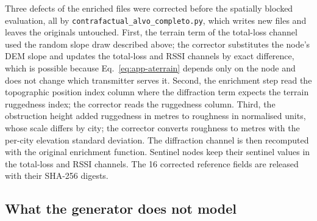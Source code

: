 Three defects of the enriched files were corrected before the spatially
blocked evaluation, all by \texttt{contrafactual\_\allowbreak{}alvo\_\allowbreak{}completo\allowbreak{}.py}, which
writes new files and leaves the originals untouched. First, the terrain term
of the total-loss channel used the random slope draw described above; the
corrector substitutes the node's DEM slope and updates the total-loss and
RSSI channels by exact difference, which is possible because
Eq.~\eqref{eq:app-aterrain} depends only on the node and does not change which
transmitter serves it. Second, the enrichment step read the topographic
position index column where the diffraction term expects the terrain
ruggedness index; the corrector reads the ruggedness column. Third, the
obstruction height added ruggedness in metres to roughness in normalised
units, whose scale differs by city; the corrector converts roughness to
metres with the per-city elevation standard deviation. The diffraction
channel is then recomputed with the original enrichment function. Sentinel
nodes keep their sentinel values in the total-loss and RSSI channels. The
16 corrected reference fields are released with their SHA-256 digests.

\subsection{What the generator does not model}

